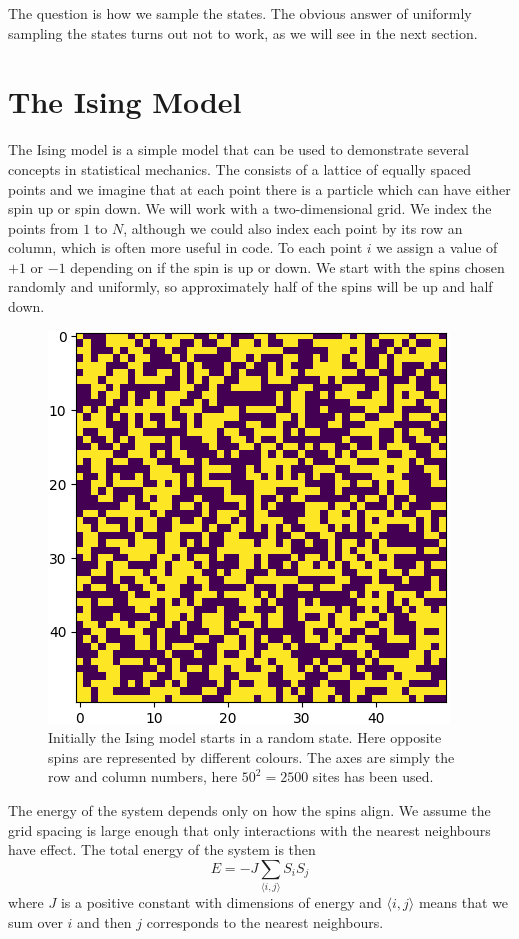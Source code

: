 \documentclass[fleqn]{NotesClass}
\begin{document}
    The question is how we sample the states.
    The obvious answer of uniformly sampling the states turns out not to work, as we will see in the next section.
    
    \section{The Ising Model}
    The Ising model is a simple model that can be used to demonstrate several concepts in statistical mechanics.
    The  consists of a lattice of equally spaced points and we imagine that at each point there is a particle which can have either spin up or spin down.
    We will work with a two-dimensional grid.
    We index the points from \(1\) to \(N\), although we could also index each point by its row an column, which is often more useful in code.
    To each point \(i\) we assign a value of \(+1\) or \(-1\) depending on if the spin is up or down.
    We start with the spins chosen randomly and uniformly, so approximately half of the spins will be up and half down.
    
    \begin{figure}
        \includegraphics[height=0.3\textheight]{images/ising-random-start}
        \caption[Random Ising Model Start.]{Initially the Ising model starts in a random state. Here opposite spins are represented by different colours. The axes are simply the row and column numbers, here \(50^2 = 2500\) sites has been used.}
    \end{figure}
    
    The energy of the system depends only on how the spins align.
    We assume the grid spacing is large enough that only interactions with the nearest neighbours have effect.
    The total energy of the system is then
    \begin{equation}
        E = -J\sum_{\langle i, j \rangle} S_iS_j
    \end{equation}
    where \(J\) is a positive constant with dimensions of energy and \(\langle i, j \rangle\) means that we sum over \(i\) and then \(j\) corresponds to the nearest neighbours.
    
\end{document}

